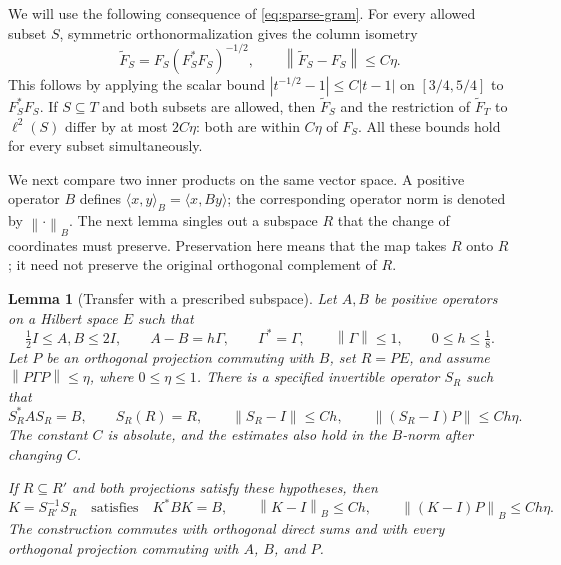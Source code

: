 \documentclass[11pt]{article}
\numberwithin{equation}{section}
\newtheorem{lemma}[theorem]{Lemma}
\theoremstyle{definition}
\theoremstyle{remark}
\newcommand{\norm}[1]{\left\lVert#1\right\rVert}
\newcommand{\id}{I}
\begin{document}
We will use the following consequence of \eqref{eq:sparse-gram}.
For every allowed subset $S$, symmetric orthonormalization gives the
column isometry
\begin{equation}\label{eq:symmetric-orthonormalization}
 \widetilde F_S=F_S(F_S^*F_S)^{-1/2},
 \qquad \norm{\widetilde F_S-F_S}\leq C\eta.
\end{equation}
This follows by applying the scalar bound
$|t^{-1/2}-1|\leq C|t-1|$ on $[3/4,5/4]$ to $F_S^*F_S$.
If $S\subseteq T$ and both subsets are allowed, then
$\widetilde F_S$ and the restriction of $\widetilde F_T$ to
$\ell^2(S)$ differ by at most $2C\eta$: both are within $C\eta$ of
$F_S$.  All these bounds hold for every subset simultaneously.

We next compare two inner products on the same vector space.  A positive
operator $B$ defines
$\langle x,y\rangle_B=\langle x,By\rangle$; the corresponding operator
norm is denoted by $\norm{\cdot}_B$.  The next lemma singles out a
subspace $R$ that the change of coordinates must preserve.  Preservation
here means that the map takes $R$ onto $R$; it need not preserve the
original orthogonal complement of $R$.

\begin{lemma}[Transfer with a prescribed subspace]\label{lem:priority}
Let $A,B$ be positive operators on a Hilbert space $E$ such that
\[
 \tfrac12\id\leq A,B\leq2\id,
 \qquad A-B=h\Gamma,
 \qquad \Gamma^*=\Gamma,
 \qquad \norm{\Gamma}\leq1,
 \qquad 0\leq h\leq\tfrac18.
\]
Let $P$ be an orthogonal projection commuting with $B$, set $R=PE$, and
assume $\norm{P\Gamma P}\leq\eta$, where $0\leq\eta\leq1$.
There is a specified invertible operator $S_R$ such that
\begin{equation}\label{eq:priority-estimates}
 S_R^*AS_R=B,\qquad S_R(R)=R,\qquad
 \norm{S_R-\id}\leq Ch,\qquad
 \norm{(S_R-\id)P}\leq Ch\eta.
\end{equation}
The constant $C$ is absolute, and the estimates also hold in the
$B$-norm after changing $C$.

If $R\subseteq R'$ and both projections satisfy these hypotheses, then
\begin{equation}\label{eq:nested-transfer}
 K=S_{R'}^{-1}S_R
 \quad\text{satisfies}\quad
 K^*BK=B,\qquad \norm{K-\id}_B\leq Ch,\qquad
 \norm{(K-\id)P}_B\leq Ch\eta.
\end{equation}
The construction commutes with orthogonal direct sums and with every
orthogonal projection commuting with $A$, $B$, and $P$.
\end{lemma}
\end{document}
